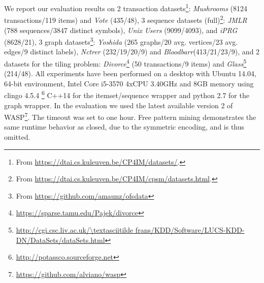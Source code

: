 We report our evaluation results on 2 transaction datasets\!\footnote{From \url{https://dtai.cs.kuleuven.be/CP4IM/datasets/}.}: \textit{Mushrooms} (8124 transactions/119 items) and \textit{Vote} (435/48), 3 sequence datasets (full)\!\footnote{From \url{https://dtai.cs.kuleuven.be/CP4IM/cpsm/datasets.html}.}: \textit{JMLR} (788 sequences/3847 distinct symbols), \textit{Unix Users} (9099/4093), and \textit{iPRG} (8628/21), 3 graph datasets\!\footnote{From \url{https://github.com/amaunz/ofsdata}}: \textit{Yoshida} (265 graphs/20 avg. vertices/23 avg. edges/9 distinct labels), \textit{Nctrer} (232/19/20/9) and \textit{Bloodbarr}(413/21/23/9), and 2 datasets for the tiling problem: \emph{Divorce}\footnote{\url{https://sparse.tamu.edu/Pajek/divorce}}  (50 transactions/9 items) and \emph{Glass}\footnote{{\scriptsize\url{http://cgi.csc.liv.ac.uk/\textasciitilde frans/KDD/Software/LUCS-KDD-DN/DataSets/dataSets.html}}} (214/48).
%
All experiments have been performed on a desktop with Ubuntu 14.04, 64-bit environment, Intel Core i5-3570 4xCPU 3.40GHz and 8GB memory using clingo 4.5.4 \!\footnote{\url{http://potassco.sourceforge.net}} C++14 for the itemset/sequence wrapper and python 2.7 for the graph wrapper. In the evaluation we used %
the latest available version 2 of WASP\footnote{\url{https://github.com/alviano/wasp}}. %
The timeout was set to one hour. Free pattern mining demonstrates the same runtime behavior as closed, due to the symmetric encoding, and is thus omitted. %
